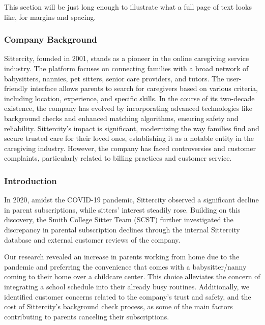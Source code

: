 \documentclass[12pt]{article}
\begin{document}
This section will be just long enough to illustrate what a full page of
text looks like, for margins and spacing.

\citep{Campbell02, Schubert13, Chi81}

\hypertarget{company-background}{%
\subsubsection{\texorpdfstring{\textbf{Company
Background}}{Company Background}}\label{company-background}}

Sittercity, founded in 2001, stands as a pioneer in the online
caregiving service industry. The platform focuses on connecting families
with a broad network of babysitters, nannies, pet sitters, senior care
providers, and tutors. The user-friendly interface allows parents to
search for caregivers based on various criteria, including location,
experience, and specific skills. In the course of its two-decade
existence, the company has evolved by incorporating advanced
technologies like background checks and enhanced matching algorithms,
ensuring safety and reliability. Sittercity's impact is significant,
modernizing the way families find and secure trusted care for their
loved ones, establishing it as a notable entity in the caregiving
industry. However, the company has faced controversies and customer
complaints, particularly related to billing practices and customer
service.

\hypertarget{introduction-1}{%
\subsubsection{\texorpdfstring{\textbf{Introduction}}{Introduction}}\label{introduction-1}}

In 2020, amidst the COVID-19 pandemic, Sittercity observed a significant
decline in parent subscriptions, while sitters' interest steadily rose.
Building on this discovery, the Smith College Sitter Team (SCST) further
investigated the discrepancy in parental subscription declines through
the internal Sittercity database and external customer reviews of the
company.

Our research revealed an increase in parents working from home due to
the pandemic and preferring the convenience that comes with a
babysitter/nanny coming to their home over a childcare center. This
choice alleviates the concern of integrating a school schedule into
their already busy routines. Additionally, we identified customer
concerns related to the company's trust and safety, and the cost of
Sittercity's background check process, as some of the main factors
contributing to parents canceling their subscriptions.
\end{document}
